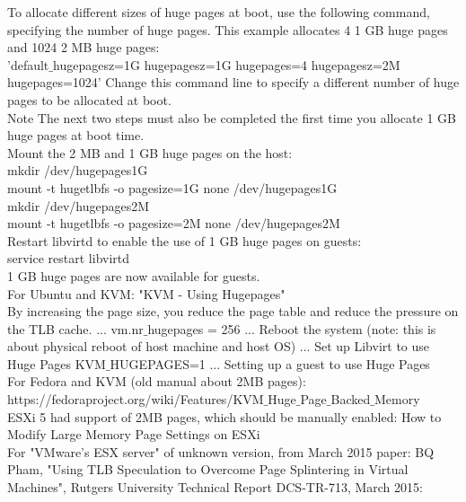 \documentclass[11pt, a4paper, oneside]{article}
\theoremstyle{definition}
\begin{document}
        To allocate different sizes of huge pages at boot, use the following command, specifying the number of huge pages. This example allocates 4 1 GB huge pages and 1024 2 MB huge pages:\\ 'default$\_$hugepagesz=1G hugepagesz=1G hugepages=4 hugepagesz=2M hugepages=1024' Change this command line to specify a different number of huge pages to be allocated at boot.\\

    Note The next two steps must also be completed the first time you allocate 1 GB huge pages at boot time.\\

        Mount the 2 MB and 1 GB huge pages on the host:\\

        mkdir /dev/hugepages1G \\
        mount -t hugetlbfs -o pagesize=1G none /dev/hugepages1G\\
         mkdir /dev/hugepages2M \\
         mount -t hugetlbfs -o pagesize=2M none /dev/hugepages2M\\

        Restart libvirtd to enable the use of 1 GB huge pages on guests:\\

        service restart libvirtd\\

    1 GB huge pages are now available for guests.\\

    For Ubuntu and KVM: "KVM - Using Hugepages"\\

    By increasing the page size, you reduce the page table and reduce the pressure on the TLB cache. ... vm.nr$\_$hugepages = 256 ... Reboot the system (note: this is about physical reboot of host machine and host OS) ... Set up Libvirt to use Huge Pages KVM$\_$HUGEPAGES=1 ... Setting up a guest to use Huge Pages\\

    For Fedora and KVM (old manual about 2MB pages): https://fedoraproject.org/wiki/Features/KVM$\_$Huge$\_$Page$\_$Backed$\_$Memory\\

    ESXi 5 had support of 2MB pages, which should be manually enabled: How to Modify Large Memory Page Settings on ESXi\\

    For "VMware’s ESX server" of unknown version, from March 2015 paper: BQ Pham, "Using TLB Speculation to Overcome Page Splintering in Virtual Machines", Rutgers University Technical Report DCS-TR-713, March 2015:\\
\end{document}
